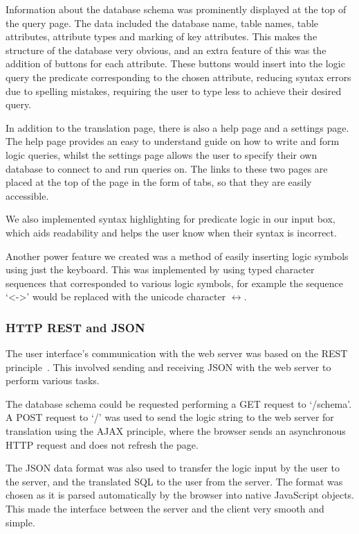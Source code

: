 \documentclass[a4paper, 11pt]{article}
\begin{document}
      Information about the database schema was prominently displayed at the top
      of the query page. The data included the database name, table names, table
      attributes, attribute types and marking of key attributes. This makes the
      structure of the database very obvious, and an extra feature of this was
      the addition of buttons for each attribute. These buttons would insert
      into the logic query the predicate corresponding to the chosen attribute,
      reducing syntax errors due to spelling mistakes, requiring the user to
      type less to achieve their desired query.

      In addition to the translation page, there is also a help page and a
      settings page. The help page provides an easy to understand guide on how
      to write and form logic queries, whilst the settings page allows the user
      to specify their own database to connect to and run queries on. The links
      to these two pages are placed at the top of the page in the form of tabs,
      so that they are easily accessible.

      We also implemented syntax highlighting for predicate logic in our input
      box, which aids readability and helps the user know when their syntax is
      incorrect.

      Another power feature we created was a method of easily inserting logic
      symbols using just the keyboard. This was implemented by using typed
      character sequences that corresponded to various logic symbols, for
      example the sequence `<->' would be replaced with the unicode character
      $\leftrightarrow$.

    \subsubsection{HTTP REST and JSON}
      The user interface's communication with the web server was based on the
      REST principle~\cite{rest}. This involved sending and receiving JSON with
      the web server to perform various tasks.

      The database schema could be requested performing a GET request to
      `/schema'. A POST request to `/' was used to send the logic string to the
      web server for translation using the AJAX principle, where the browser
      sends an asynchronous HTTP request and does not refresh the page.

      The JSON data format was also used to transfer the logic input by the user
      to the server, and the translated SQL to the user from the server. The
      format was chosen as it is parsed automatically by the browser into
      native JavaScript objects. This made the interface between the server and
      the client very smooth and simple.
\end{document}
